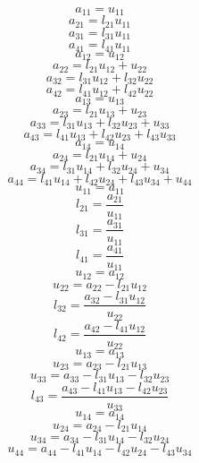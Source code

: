 \documentclass[10pt,a4paper,dvipdfmx]{article}
\begin{document}
\begin{multicols}{2}
$$ a_{{1}{1}} = u_{{1}{1}} $$
$$ a_{{2}{1}} = l_{{2}{1}} u_{{1}{1}} $$
$$ a_{{3}{1}} = l_{{3}{1}} u_{{1}{1}} $$
$$ a_{{4}{1}} = l_{{4}{1}} u_{{1}{1}} $$
$$ a_{{1}{2}} = u_{{1}{2}} $$
$$ a_{{2}{2}} = l_{{2}{1}} u_{{1}{2}} + u_{{2}{2}} $$
$$ a_{{3}{2}} = l_{{3}{1}} u_{{1}{2}} + l_{{3}{2}} u_{{2}{2}} $$
$$ a_{{4}{2}} = l_{{4}{1}} u_{{1}{2}} + l_{{4}{2}} u_{{2}{2}} $$
$$ a_{{1}{3}} = u_{{1}{3}} $$
$$ a_{{2}{3}} = l_{{2}{1}} u_{{1}{3}} + u_{{2}{3}} $$
$$ a_{{3}{3}} = l_{{3}{1}} u_{{1}{3}} + l_{{3}{2}} u_{{2}{3}} + u_{{3}{3}} $$
$$ a_{{4}{3}} = l_{{4}{1}} u_{{1}{3}} + l_{{4}{2}} u_{{2}{3}} + l_{{4}{3}} u_{{3}{3}} $$
$$ a_{{1}{4}} = u_{{1}{4}} $$
$$ a_{{2}{4}} = l_{{2}{1}} u_{{1}{4}} + u_{{2}{4}} $$
$$ a_{{3}{4}} = l_{{3}{1}} u_{{1}{4}} + l_{{3}{2}} u_{{2}{4}} + u_{{3}{4}} $$
$$ a_{{4}{4}} = l_{{4}{1}} u_{{1}{4}} + l_{{4}{2}} u_{{2}{4}} + l_{{4}{3}} u_{{3}{4}} + u_{{4}{4}} $$
\vfill\null
\columnbreak
$$ u_{{1}{1}} = a_{{1}{1}} $$
$$ l_{{2}{1}} = \dfrac{a_{{2}{1}}}{u_{{1}{1}}} $$
$$ l_{{3}{1}} = \dfrac{a_{{3}{1}}}{u_{{1}{1}}} $$
$$ l_{{4}{1}} = \dfrac{a_{{4}{1}}}{u_{{1}{1}}} $$
$$ u_{{1}{2}} = a_{{1}{2}} $$
$$ u_{{2}{2}} = a_{{2}{2}}- l_{{2}{1}} u_{{1}{2}} $$
$$ l_{{3}{2}} = \dfrac{a_{{3}{2}}- l_{{3}{1}} u_{{1}{2}}}{u_{{2}{2}}} $$
$$ l_{{4}{2}} = \dfrac{a_{{4}{2}}- l_{{4}{1}} u_{{1}{2}}}{u_{{2}{2}}} $$
$$ u_{{1}{3}} = a_{{1}{3}} $$
$$ u_{{2}{3}} = a_{{2}{3}}- l_{{2}{1}} u_{{1}{3}} $$
$$ u_{{3}{3}} = a_{{3}{3}}- l_{{3}{1}} u_{{1}{3}}- l_{{3}{2}} u_{{2}{3}} $$
$$ l_{{4}{3}} = \dfrac{a_{{4}{3}}- l_{{4}{1}} u_{{1}{3}}- l_{{4}{2}} u_{{2}{3}}}{u_{{3}{3}}} $$
$$ u_{{1}{4}} = a_{{1}{4}} $$
$$ u_{{2}{4}} = a_{{2}{4}}- l_{{2}{1}} u_{{1}{4}} $$
$$ u_{{3}{4}} = a_{{3}{4}}- l_{{3}{1}} u_{{1}{4}}- l_{{3}{2}} u_{{2}{4}} $$
$$ u_{{4}{4}} = a_{{4}{4}}- l_{{4}{1}} u_{{1}{4}}- l_{{4}{2}} u_{{2}{4}}- l_{{4}{3}} u_{{3}{4}} $$
\end{multicols}
\end{document}
